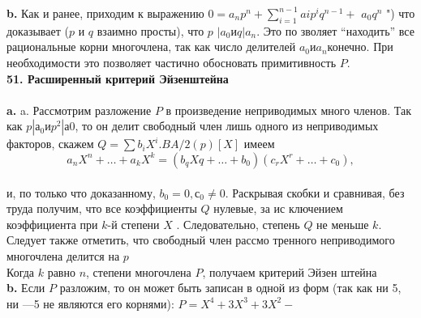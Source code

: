\documentclass{mai_book}
\begin{document}
\hspace*{15pt}\textbf{b.} Как и ранее, приходим к выражению $0 = a_{n}p^{n} + \sum^{n-1}_{i=1}a{i}p^{i}q^{n-1}+$\linebreak
$a_{0}q^n$ ") что доказывает ($p$ и $q$ взаимно просты), что $p$ $| a_0 и q | a_n$. Это по­\linebreak
зволяет “находить” все рациональные корни многочлена, так как число\linebreak
делителей $a_0 и a_n $конечно. При необходимости это позволяет частично\linebreak
обосновать примитивность $P$.\\
\newpage
\noindent\textbf{51. Расширенный критерий Эйзенштейна}\\
\\
\hspace*{15pt}\textbf{a.} a. Рассмотрим разложение $P$ в произведение неприводимых много­\linebreak
членов. Так как $p | а_0 и p^{2} |а0$, то он делит свободный член лишь одного\linebreak
из неприводимых факторов, скажем  $Q = \sum b_{i}X^{i}. B A/2(p)[X]$ имеем
$$a_{n}X^{n}+\ldots+a_{k}X^{k} = (b_{q}X{q}+\ldots+b_0)(c_{r}X^{r}+\ldots+c_0),$$
\\
\noindent и, по только что доказанному, $b_0 = 0, с_0 \neq 0.$ Раскрывая скобки и\linebreak
сравнивая, без труда получим, что все коэффициенты $Q$ нулевые, за ис­\linebreak
ключением коэффициента при $k$-й степени $X$ . Следовательно, степень\linebreak
$Q$ не меньше $k$. Следует также отметить, что свободный член рассмо­\linebreak
тренного неприводимого многочлена делится на $p$\\
\hspace*{0pt} Когда $k$ равно $n$, степени многочлена $P$, получаем критерий Эйзен­\linebreak
штейна\\
\hspace*{15pt}\textbf{b.} Если $P$ разложим, то он может быть записан в одной из форм\linebreak
(так как ни 5, ни —5 не являются его корнями): $P = X^{4} + 3X^{3} + 3X^{2} -$\linebreak
\end{document}
